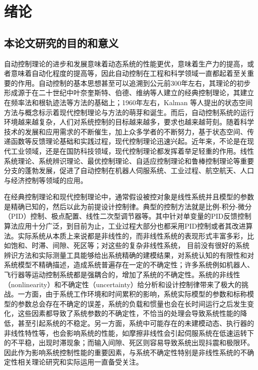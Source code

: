 \chapter{绪论}
\label{chap:intro}
\section{本论文研究的目的和意义}%

自动控制理论的进步和发展意味着动态系统的性能更优，意味着生产力的提高，或者意味着自动化程度的提高等，因此自动控制在工程和科学领域一直都起着至关重要的作用。自动控制的基本思想甚至可以追溯到公元前300年左右，其理论的初步形成源于在二十世纪中叶奈奎斯特、伯德、维纳等人建立的经典控制理论，其建立在频率法和根轨迹法等方法的基础上；1960年左右，Kalman 等人提出的状态空间方法与概念标示着现代控制理论与方法的萌芽和诞生。而后，自动控制系统的运行环境越来越复杂，人们对系统控制的目标越来越多，要求也越来越苛刻。随着科学技术的发展和应用需求的不断催生，加上众多学者的不断努力，基于状态空间、传递函数等反馈理论基础和实践过程，现代控制理论迅速兴起。近年来，不论是在现代工业领域，还是在国防科技领域，现代控制理论都发挥着举足轻重的作用。线性系统理论、系统辨识理论、最优控制理论、自适应控制理论和鲁棒控制理论等重要分支的蓬勃发展，促进了自动控制在机器人伺服系统、工业过程、航空航天、人口与经济控制等领域的应用。

在经典控制理论和现代控制理论中，通常假设被控对象是线性系统并且模型的参数是精确已知的，然后以此为前提设计控制律。典型的控制方法就是比例-积分-微分（PID）控制、极点配置、线性二次型调节器等。其中针对单变量的PID反馈控制算法应用十分广泛，到目前为止，工业过程大部分也都采用PID控制或者其改进算法。实际系统从本质上来说都是非线性的，而非线性系统的表现形式丰富多彩，比如饱和、时滞、间隙、死区等；对这些的复杂非线性系统， 目前没有很好的系统辨识方法和实际测量工具能够给出系统精确的建模结果，对系统认知的有限性和对系统模型不精确描述，造成系统普遍存在一定的不确定性；许多系统例如机器人、飞行器等运动控制系统都是强耦合的，增加了系统的不确定性。系统的非线性（nonlinearity）和不确定性（uncertainty）给分析和设计控制律带来了极大的挑战。一方面，由于系统工作环境和时间累积的影响，系统实际模型的参数和标称模型的参数总会存在不确定的误差，系统的负载和惯量也会在长时间运行之后发生变化，这些因素都导致了系统参数的不确定性，不恰当的处理会导致系统性能的降低，甚至引起系统的不稳定。另一方面，系统中可能存在的未建模动态、执行器的非线性特性等，也会影响系统的性能，如摩擦非线性会引起伺服系统在低速运转下的不平稳，出现时滞现象；而输入间隙、死区则容易导致系统出现抖震和极限环。因此作为影响系统控制性能的重要因素，与系统不确定性特别是非线性系统的不确定性相关理论研究和实际运用一直备受关注。

